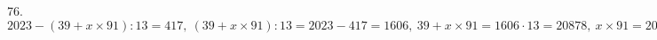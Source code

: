 76. $2023 - (39 + x \times 91) : 13 = 417,\ (39 + x \times 91) : 13 = 2023-417=1606,\ 39 + x \times 91=1606\cdot13=20878,\ x \times 91=20878-39=20839,\ x=20839:91=229.$\\

